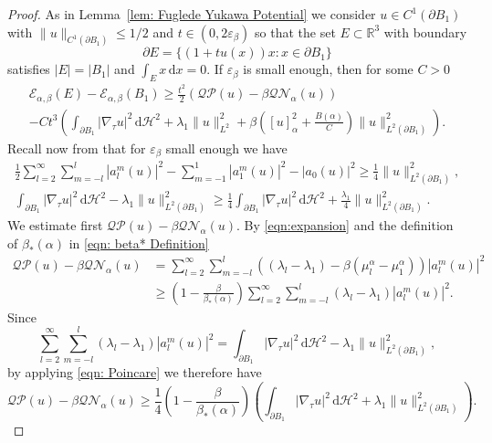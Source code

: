 \documentclass[a4paper,11pt,reqno]{amsart}
\numberwithin{equation}{section}
\theoremstyle{remark}
\theoremstyle{definition}
\let\epsilon\varepsilon
\newcommand{\dd}{\,\mathrm{d}}
\newcommand{\ene}{\mathcal{E}_{\alpha,\beta}}
\newcommand{\nl}{\mathcal{N}_{\alpha}}
\renewcommand{\leq}{\leqslant}
\renewcommand{\geq}{\geqslant}
\begin{document}
\begin{proof}
As in Lemma~\ref{lem: Fuglede Yukawa Potential} we consider $u\in C^1(\partial B_1)$ with $\|u\|_{C^1(\partial B_1)}\leq 1/2$ and $t\in (0,2\epsilon_{\beta})$ so that the set $E\subset \mathbb{R}^3$ with boundary 
	\[
		\partial E = \Big\lbrace (1+tu(x))x \colon x\in \partial B_1\Big\rbrace
	\]
satisfies $|E|=|B_1|$ and $\int_E x \dd x=0$. If $\epsilon_{\beta}$ is small enough, then for some $C>0$
	\begin{multline*}
		\ene(E)-\ene(B_1) \geq \frac{t^2}{2}\left(\mathcal{QP}(u)-\beta \mathcal{QN}_{\alpha}(u)\right) \\
  -Ct^3\left(\int_{\partial B_1}|\nabla_{\tau} u|^2 \dd\mathcal{H}^2+\lambda_1\|u\|_{L^2}^2+\beta \left([u]_{\alpha}^2+\frac{B(\alpha)}{C}\right) \|u\|_{L^2(\partial B_1)}^2\right).
	\end{multline*}	
Recall now from \cite[Eqs. (2.25) and (2.28)]{FFMMM} that for $\epsilon_{\beta}$ small enough we have
	\begin{gather}
		\frac{1}{2}\sum_{l=2}^{\infty}\sum_{m=-l}^l |a_l^m(u)|^2 - \sum_{m=-1}^1 |a_1^m(u)|^2-|a_0(u)|^2 \geq \frac{1}{4}\|u\|_{L^2(\partial B_1)}^2, \label{eqn: Sums Bound L2}	\\
\int_{\partial B_1} |\nabla_{\tau}u|^2 \dd\mathcal{H}^2 - \lambda_1\|u\|_{L^2(\partial B_1)}^2 \geq \frac{1}{4}\int_{\partial B_1} |\nabla_{\tau}u|^2 \dd\mathcal{H}^2+\frac{\lambda_1}{4}\|u\|_{L^2(\partial B_1)}^2 .\label{eqn: Poincare}
	\end{gather}
We estimate first $\mathcal{QP}(u)-\beta\mathcal{QN}_{\alpha}(u)$. By \eqref{eqn:expansion} and the definition of $\beta_*(\alpha)$ in \eqref{eqn: beta* Definition}
	\begin{align*}
		\mathcal{QP}(u)-\beta \mathcal{Q\nl}(u) &= \sum_{l=2}^{\infty}\sum_{m=-l}^{l}\left((\lambda_l - \lambda_1)-\beta(\mu_l^{\alpha} - \mu_1^\alpha)\right) |a_l^m(u)|^2 \\
					&\geq \left(1-\frac{\beta}{\beta_*(\alpha)}\right)\sum_{l=2}^{\infty}\sum_{m=-l}^{l}(\lambda_l - \lambda_1) |a_l^m(u)|^2 .
	\end{align*}
Since
	\[
	 \sum_{l=2}^{\infty}\sum_{m=-l}^{l}(\lambda_l - \lambda_1) |a_l^m(u)|^2 = \int_{\partial B_1}|\nabla_{\tau} u|^2 \dd\mathcal{H}^2 - \lambda_1 \|u\|_{L^2(\partial B_1)}^2,
	\]
by applying \eqref{eqn: Poincare} we therefore have
	\begin{equation}\label{eqn: Functional Difference Bound}
		\mathcal{QP}(u)-\beta \mathcal{Q\nl}(u) \geq  \frac{1}{4}\left(1-\frac{\beta}{\beta_*(\alpha)}\right)\left(\int_{\partial B_1}|\nabla_{\tau} u|^2 \dd\mathcal{H}^2 + \lambda_1 \|u\|_{L^2(\partial B_1)}^2\right).

\end{equation}
\end{proof}
\end{document}
